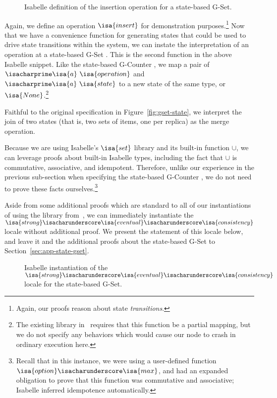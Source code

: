\begin{figure}[H]
  
  \caption{Isabelle definition of the insertion operation for a state-based
    G-Set.}
\end{figure}

Again, we define an operation $\isa{insert}$ for demonstration
purposes.\footnote{Again, our proofs reason about state \emph{transitions}.} Now
that we have a convenience function for generating states that could be used to
drive state transitions within the system, we can instate the interpretation of
an operation at a state-based G-Set \CRDT. This is the second function in the
above Isabelle snippet. Like the state-based G-Counter \CRDT, we map a pair of
$\isacharprime\isa{a}~\isa{operation}$ and $\isacharprime\isa{a}~\isa{state}$ to
a new state of the same type, or $\isa{None}$.\footnote{The existing library
in~\citet{gomes17} requires that this function be a partial mapping, but we do
not specify any behaviors which would cause our node to crash in ordinary
execution here.}

Faithful to the original specification in Figure~\ref{fig:gset-state}, we
interpret the join of two states (that is, two sets of items, one per replica)
as the merge operation.

Because we are using Isabelle's $\isa{set}$ library and its built-in function
$\cup$, we can leverage proofs about built-in Isabelle types, including the fact
that $\cup$ is commutative, associative, and idempotent. Therefore, unlike our
experience in the previous sub-section when specifying the state-based G-Counter
\CRDT, we do not need to prove these facts ourselves.\footnote{Recall that in
this instance, we were using a user-defined function
$\isa{option}\isacharunderscore\isa{max}$, and had an expanded obligation to
prove that this function was commutative and associative; Isabelle inferred
idempotence automatically.}

Aside from some additional proofs which are standard to all of our
instantiations of \CRDTs using the library from~\citet{gomes17}, we can
immediately instantiate the
$\isa{strong}\isacharunderscore\isa{eventual}\isacharunderscore\isa{consistency}$
locale without additional proof. We present the statement of this locale below,
and leave it and the additional proofs about the state-based G-Set to
Section~\ref{sec:app-state-gset}.

\begin{figure}[H]
  
  \caption{Isabelle instantiation of the
    $\isa{strong}\isacharunderscore\isa{eventual}\isacharunderscore\isa{consistency}$
    locale for the state-based G-Set.}
\end{figure}

